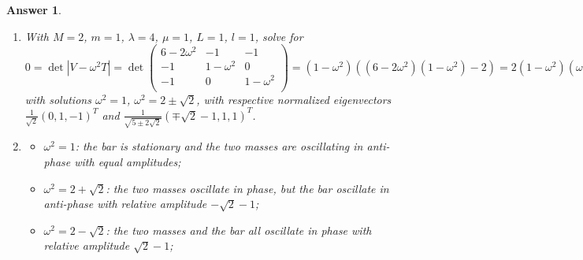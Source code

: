 \documentclass[a4paper]{article}
\newtheorem{ans}{Answer}[section]
\theoremstyle{new}
\begin{document}
\begin{ans}
\begin{enumerate}[label=(\roman*)]
$$\mathcal{L}=\frac{1}{2}\begin{pmatrix}\dot{q}_1&\dot{q}_2&\dot{q}_3\\\end{pmatrix}\begin{pmatrix}M&0&0\\0&m&0\\0&0&m\\\end{pmatrix}\begin{pmatrix}\dot{q}_1\\\dot{q}_2\\\dot{q}_3\\\end{pmatrix}-\frac{1}{2}\begin{pmatrix}q_1&q_2&q_3\\\end{pmatrix}\begin{pmatrix}\lambda+2\mu&-\mu&-\mu\\-\mu&\mu&0\\-\mu&0&\mu\\\end{pmatrix}\begin{pmatrix}q_1\\q_2\\q_3\\\end{pmatrix}$$
\item With $M=2$, $m=1$, $\lambda=4$, $\mu=1$, $L=1$, $l=1$, solve for
$$0=\det|V-\omega^2T|=\det\begin{pmatrix}6-2\omega^2&-1&-1\\-1&1-\omega^2&0\\-1&0&1-\omega^2\\\end{pmatrix}=(1-\omega^2)((6-2\omega^2)(1-\omega^2)-2)=2(1-\omega^2)(\omega^4-4\omega^2+2)$$
with solutions $\omega^2=1$, $\omega^2=2\pm\sqrt{2}$, with respective normalized eigenvectors $\frac{1}{\sqrt{2}}(0,1,-1)^T$ and $\frac{1}{\sqrt{5\pm2\sqrt{2}}}(\mp\sqrt{2}-1,1,1)^T$.
\item 
\begin{itemize}
    \item $\omega^2=1$: the bar is stationary and the two masses are oscillating in anti-phase with equal amplitudes;
    \item $\omega^2=2+\sqrt{2}$: the two masses oscillate in phase, but the bar oscillate in anti-phase with relative amplitude $-\sqrt{2}-1$;
    \item $\omega^2=2-\sqrt{2}$: the two masses and the bar all oscillate in phase with relative amplitude $\sqrt{2}-1$;
\end{itemize}
\end{enumerate}
\end{ans}
\end{document}

